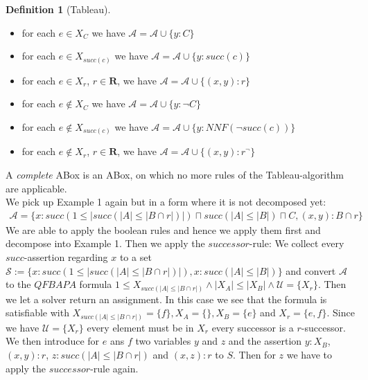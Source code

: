 \documentclass{book}
\theoremstyle{break}
\theoremstyle{definition}
\newtheorem{mydef}{Definition}
\begin{document}
\begin{mydef}[Tableau]
\begin{itemize}
\begin{itemize}
\item for each $e\in X_C$ we have $\mathcal{A}=\mathcal{A}\cup\{y:C\}$
\item for each $e\in X_{succ(c)}$ we have $\mathcal{A}=\mathcal{A}\cup\{y:succ(c)\}$
\item for each $e\in X_r$, $r\in\mathbf{R}$, we have $\mathcal{A}=\mathcal{A}\cup\{(x,y):r\}$
\item for each $e\notin X_C$ we have $\mathcal{A}=\mathcal{A}\cup\{y:\neg C\}$
\item for each $e\notin X_{succ(c)}$ we have $\mathcal{A}=\mathcal{A}\cup\{y: NNF(\neg succ(c))\}$
\item for each $e\notin X_r$, $r\in\mathbf{R}$, we have $\mathcal{A}=\mathcal{A}\cup\{(x,y):r^\neg\}$
\end{itemize}
\end{itemize}
\end{mydef}
A \textit{complete} ABox is an ABox, on which no more rules of the Tableau-algorithm are applicable.\\
We pick up Example 1 again but in a form where it is not decomposed yet:
\begin{align*}
\mathcal{A}=\{x:succ(1\leq|succ(|A|\leq|B\cap r|)|)\sqcap succ(|A|\leq |B|)\sqcap C, (x,y):B\cap r\}
\end{align*}
We are able to apply the boolean rules and hence we apply them first and decompose into Example 1. Then we apply the $successor$-rule: We collect every $succ$-assertion regarding $x$ to a set $\mathcal{S}:=\{x:succ(1\leq|succ(|A|\leq|B\cap r|)|), x:succ(|A|\leq |B|)\}$ and convert $\mathcal{A}$ to the $QFBAPA$ formula $1\leq X_{succ(|A|\leq |B\cap r|)}\wedge|X_A|\leq |X_B|\wedge \mathcal{U}=\{X_r\}$. Then we let a solver return an assignment. In this case we see that the formula is satisfiable with $X_{succ(|A|\leq |B\cap r|)}=\{f\},X_A=\{\},X_B=\{e\}$ and $X_r=\{e,f\}$. Since we have $\mathcal{U}=\{X_r\}$ every element must be in $X_r$ every successor is a $r$-successor. We then introduce for $e$ ans $f$ two variables $y$ and $z$ and the assertion $y:X_B$, $(x,y):r$, $z:succ(|A|\leq|B\cap r|)$ and $(x,z):r$ to $S$. Then for $z$ we have to apply the $successor$-rule again.
\end{document}
